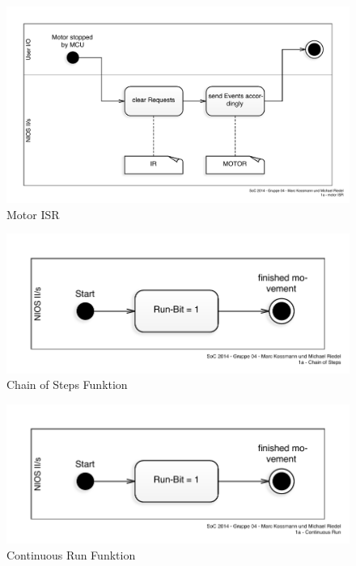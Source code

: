 \documentclass[ngerman,fontsize=12pt , paper=a4 , twoside=false , DIV12 , BCOR=1cm ,
numbers=enddot , listof=totoc , bibliography=totoc , index=totoc ,
headings=small , headlines=1.5 , final]{scrbook}
\begin{document}
\begin{figure}[htbp]
\centering
\includegraphics{../Diagrams/Activities/ISR/motor_ISR.pdf}
\caption{Motor ISR\label{fig:motor_isr}}
\end{figure}

\newpage

\begin{figure}[htbp]
\centering
\includegraphics{../Diagrams/Activities/Functions/Chain-of-Steps.pdf}
\caption{Chain of Steps Funktion\label{fig:chain_of_steps}}
\end{figure}

\begin{figure}[htbp]
\centering
\includegraphics{../Diagrams/Activities/Functions/Continuous-Run.pdf}
\caption{Continuous Run Funktion\label{fig:continuous_run}}
\end{figure}
\end{document}
